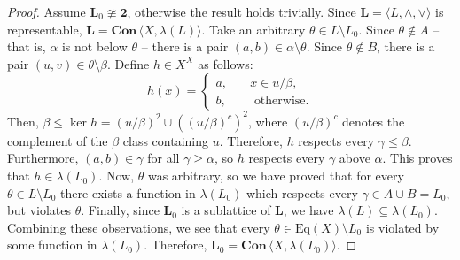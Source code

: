 \documentclass[cm,dissertation,actual,final]{uhthesis}
\theoremstyle{plain}
\theoremstyle{definition}
\theoremstyle{remark}
\numberwithin{theorem}{section}
\numberwithin{claim}{chapter}
\numberwithin{equation}{section}
\numberwithin{conjecture}{chapter}
\newcommand{\<}{\ensuremath{\langle}}
\renewcommand{\>}{\ensuremath{\rangle}}
\renewcommand{\leq}{\ensuremath{\leqslant}}
\renewcommand{\geq}{\ensuremath{\geqslant}}
\newcommand{\meet}{\ensuremath{\wedge}}
\newcommand{\join}{\ensuremath{\vee}}
\newcommand{\Eq}{\ensuremath{\mathrm{Eq}}}
\newcommand{\bCon}{\ensuremath{\mathbf{Con\,}}}
\newcommand{\0}{\ensuremath{\mathbf{0}}}
\newcommand{\1}{\ensuremath{\mathbf{1}}}
\newcommand{\2}{\ensuremath{\mathbf{2}}}
\newcommand{\3}{\ensuremath{\mathbf{3}}}
\newcommand{\4}{\ensuremath{\mathbf{4}}}
\newcommand{\5}{\ensuremath{\mathbf{5}}}
\newcommand{\bL}{\ensuremath{\mathbf{L}}}
\newcommand{\two}{\ensuremath{\mathbf{2}}}
\begin{document}
\vskip3mm

      \begin{center}
      \end{center}

\vskip3mm

\begin{proof}
Assume $\bL_0 \ncong \two$, otherwise the result holds trivially. 
Since $\bL=\<L, \meet, \join\>$ is representable, $\bL = \bCon
\<X, \lambda(L)\>$.  Take an arbitrary $\theta \in L \setminus L_0$. Since $\theta \notin
A$ -- that is, $\alpha$ is not below $\theta$ -- there is a pair $(a,b) \in
\alpha \setminus \theta$.  Since $\theta \notin B$, there is a pair $(u,v)\in
\theta\setminus \beta$. Define $h\in X^X$ as follows:
\begin{equation*}
h(x) = \begin{cases}
a,& \quad x\in u/\beta,\\
b,& \quad \text{ otherwise.}
\end{cases}
\end{equation*}
Then, $\beta \leq \ker h = (u/\beta)^2 \cup ((u/\beta)^c)^2$, where $(u/\beta)^c$ denotes the
complement of the $\beta$ class containing $u$.  Therefore, $h$ respects every
$\gamma \leq \beta$.  Furthermore, $(a, b) \in \gamma$ for all $\gamma \geq \alpha$,
so $h$ respects every $\gamma$ above $\alpha$.  This proves that $h\in \lambda(L_0)$.
Now, $\theta$ was arbitrary, so we have proved that for every $\theta \in L
\setminus L_0$ there exists a function in $\lambda(L_0)$ which respects every
$\gamma \in A\cup B = L_0$, but violates $\theta$.  Finally, since $\bL_0$ is a
sublattice of $\bL$, we have $\lambda(L)\subseteq \lambda(L_0)$.  Combining these
observations, we see that every $\theta \in \Eq(X) \setminus L_0$ is
violated by some function in $\lambda(L_0)$. Therefore, $\bL_0 = \bCon \< X, \lambda(L_0)\>$.
\end{proof}
\end{document}
